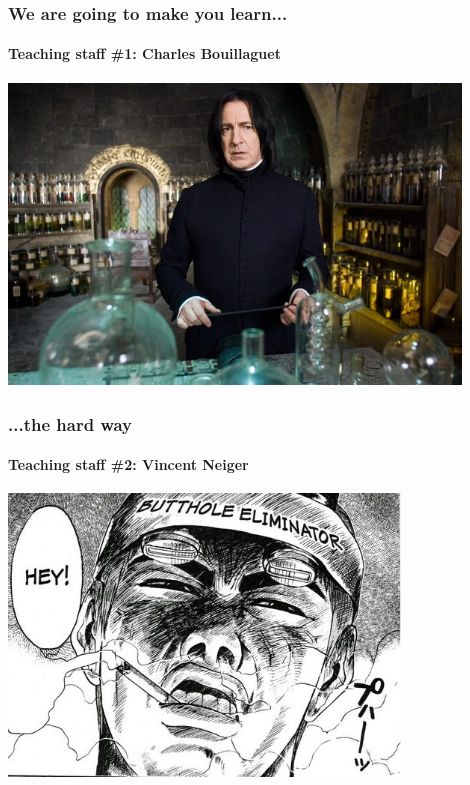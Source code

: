 \documentclass[10pt]{beamer}
\begin{document}
{
\begin{frame}
  \frametitle{\color{white} We are going to \textbf{make you} learn...}
  \framesubtitle{\color{white} Teaching staff \#1: Charles Bouillaguet}
  
  \centering
  \includegraphics[height=8cm]{severus.jpg}
\end{frame}
}


{
\begin{frame}
  \frametitle{\color{white} ...the \textbf{hard} way}
  \framesubtitle{\color{white} Teaching staff \#2: Vincent Neiger}

  \centering
  \includegraphics[height=7.5cm]{gto.jpg}
\end{frame}
}

\end{document}
